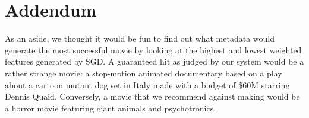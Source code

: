 \documentclass[journal]{IEEEtran}
\begin{document}
\section{Addendum}
As an aside, we thought it would be fun to find out what metadata would
generate the most successful movie by looking at the highest and lowest
weighted features generated by SGD.
A guaranteed hit as judged by our system would be a rather strange movie: a stop-motion animated documentary based on a play about a cartoon mutant dog set in Italy made with a budget of \$60M starring Dennis Quaid. Conversely, a movie that we recommend against making would be a horror movie featuring giant animals and psychotronics.
\end{document}
